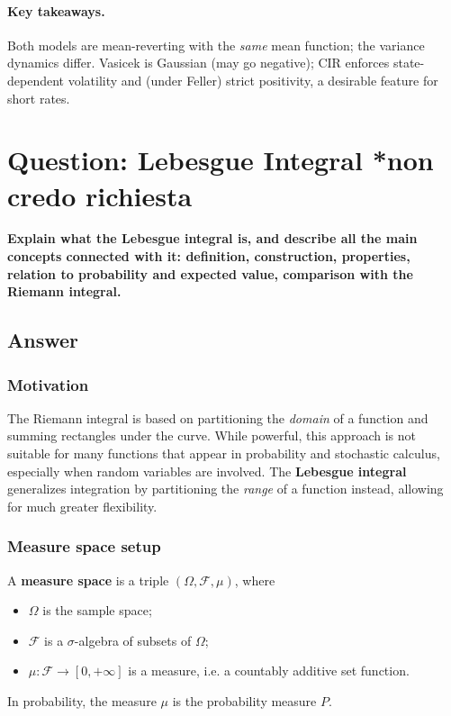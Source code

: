 \documentclass[12pt,a4paper]{book}
\theoremstyle{remark}
\begin{document}
\paragraph{Key takeaways.}
Both models are mean-reverting with the \emph{same} mean function; the variance dynamics differ. Vasicek is Gaussian (may go negative); CIR enforces state-dependent volatility and (under Feller) strict positivity, a desirable feature for short rates.






\newpage
\section{Question: Lebesgue Integral *non credo richiesta}
\textbf{Explain what the Lebesgue integral is, and describe all the main concepts connected with it: 
definition, construction, properties, relation to probability and expected value, 
comparison with the Riemann integral.}

\subsection*{Answer}

\subsubsection*{Motivation}
The Riemann integral is based on partitioning the \emph{domain} of a function and summing rectangles 
under the curve. While powerful, this approach is not suitable for many functions that appear 
in probability and stochastic calculus, especially when random variables are involved.  
The \textbf{Lebesgue integral} generalizes integration by partitioning the \emph{range} of a function 
instead, allowing for much greater flexibility.

\subsubsection*{Measure space setup}
A \textbf{measure space} is a triple $(\Omega,\mathcal{F},\mu)$, where
\begin{itemize}
    \item $\Omega$ is the sample space;
    \item $\mathcal{F}$ is a $\sigma$-algebra of subsets of $\Omega$;
    \item $\mu:\mathcal{F}\to [0,+\infty]$ is a measure, i.e. a countably additive set function.
\end{itemize}
In probability, the measure $\mu$ is the probability measure $P$.
\end{document}
